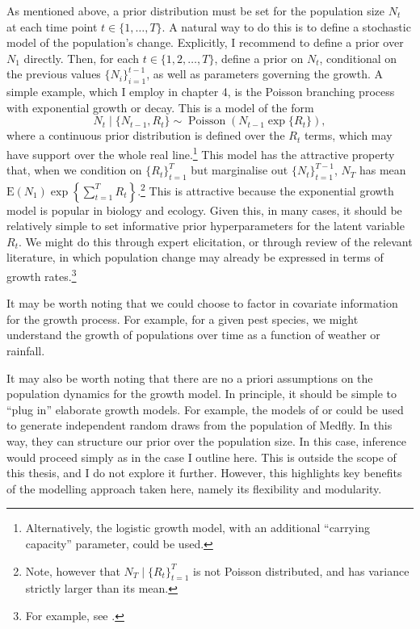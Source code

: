 \documentclass[
  oneside]{book}
\begin{document}
As mentioned above, a prior distribution must be set for the population size \(N_t\) at each time point \(t \in \{1, \ldots, T\}\). A natural way to do this is to define a stochastic model of the population's change. Explicitly, I recommend to define a prior over \(N_1\) directly. Then, for each \(t \in \{1,2, \ldots, T\}\), define a prior on \(N_t\), conditional on the previous values \(\{N_i\}_{i=1}^{t-1}\), as well as parameters governing the growth. A simple example, which I employ in chapter 4, is the Poisson branching process with exponential growth or decay. This is a model of the form
\[
N_t \mid \{N_{t-1}, R_t\} \sim \operatorname{Poisson}(N_{t-1} \exp \{R_t\}),
\]
where a continuous prior distribution is defined over the \(R_t\) terms, which may have support over the whole real line.\footnote{Alternatively, the logistic growth model, with an additional ``carrying capacity'' parameter, could be used.} This model has the attractive property that, when we condition on \(\{R_t\}_{t=1}^T\) but marginalise out \(\{N_t\}_{t=1}^{T-1}\), \(N_T\) has mean \(\mathrm E(N_1) \exp \left\{ \sum_{t=1}^T R_t \right\}\).\footnote{Note, however that \(N_T \mid \{R_t\}_{t=1}^T\) is not Poisson distributed, and has variance strictly larger than its mean.} This is attractive because the exponential growth model is popular in biology and ecology. Given this, in many cases, it should be relatively simple to set informative prior hyperparameters for the latent variable \(R_t\). We might do this through expert elicitation, or through review of the relevant literature, in which population change may already be expressed in terms of growth rates.\footnote{For example, see \citet{papadopoulos2002}.}

It may be worth noting that we could choose to factor in covariate information for the growth process. For example, for a given pest species, we might understand the growth of populations over time as a function of weather or rainfall.

It may also be worth noting that there are no a priori assumptions on the population dynamics for the growth model. In principle, it should be simple to ``plug in'' elaborate growth models. For example, the models of \citet{lux2018} or \citet{manoukis2014} could be used to generate independent random draws from the population of Medfly. In this way, they can structure our prior over the population size. In this case, inference would proceed simply as in the case I outline here. This is outside the scope of this thesis, and I do not explore it further. However, this highlights key benefits of the modelling approach taken here, namely its flexibility and modularity.
\end{document}
